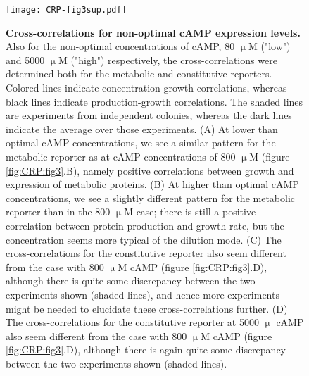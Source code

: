 
\begin{figure}
	\centering
	\texttt{[image: CRP-fig3sup.pdf]}
	\caption{ 
		\textbf{Cross-correlations for non-optimal cAMP expression levels.}
		Also for the non-optimal concentrations of cAMP, 80 $\upmu$M ("low") and 5000 $\upmu$M ("high") respectively, the cross-correlations were determined both for the metabolic and constitutive reporters.
		Colored lines indicate concentration-growth correlations, whereas black lines indicate production-growth correlations.
		The shaded lines are experiments from independent colonies, whereas the dark lines indicate the average over those experiments.
		(A) At lower than optimal cAMP concentrations, we see a similar pattern for the metabolic reporter as at cAMP concentrations of 800 $\upmu$M (figure \ref{fig:CRP:fig3}.B), namely positive correlations between growth and expression of metabolic proteins.
		(B) At higher than optimal cAMP concentrations, we see a slightly different pattern for the metabolic reporter than in the 800 $\upmu$M case; there is still a positive correlation between protein production and growth rate, but the concentration seems more typical of the dilution mode. 
		(C) The cross-correlations for the constitutive reporter also seem different from the case with 800 $\upmu$M cAMP (figure \ref{fig:CRP:fig3}.D), although there is quite some discrepancy between the two experiments shown (shaded lines), and hence more experiments might be needed to elucidate these cross-correlations further.
		(D) The cross-correlations for the constitutive reporter at 5000 $\upmu$ cAMP also seem different from the case with 800 $\upmu$M cAMP (figure \ref{fig:CRP:fig3}.D), although there is again quite some discrepancy between the two experiments shown (shaded lines).
	}
	\label{fig:CRP:fig3sup}
\end{figure}



